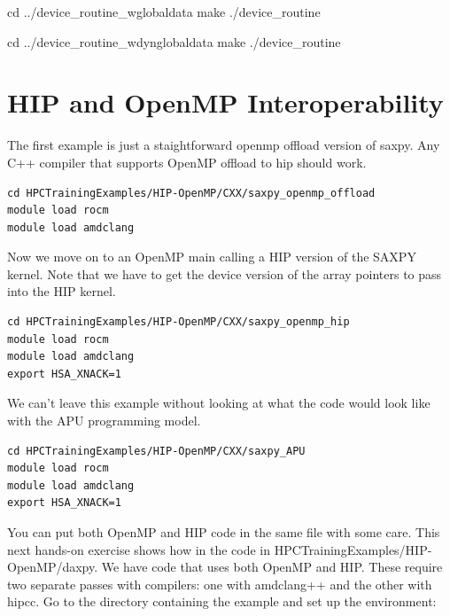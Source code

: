 \documentclass[
]{article}
\newenvironment{Shaded}{}{}
\newcommand{\BuiltInTok}[1]{#1}
\newcommand{\ExtensionTok}[1]{#1}
\newcommand{\FunctionTok}[1]{\textcolor[rgb]{0.02,0.16,0.49}{#1}}
\newcommand{\NormalTok}[1]{#1}
\begin{document}
\begin{Shaded}
\begin{Highlighting}[]
\BuiltInTok{cd}\NormalTok{ ../device\_routine\_wglobaldata}
\FunctionTok{make}
\ExtensionTok{./device\_routine}
\end{Highlighting}
\end{Shaded}

\begin{Shaded}
\begin{Highlighting}[]
\BuiltInTok{cd}\NormalTok{ ../device\_routine\_wdynglobaldata}
\FunctionTok{make}
\ExtensionTok{./device\_routine}
\end{Highlighting}
\end{Shaded}

\hypertarget{hip-and-openmp-interoperability}{%
\section{HIP and OpenMP
Interoperability}\label{hip-and-openmp-interoperability}}

The first example is just a staightforward openmp offload version
of saxpy. Any C++ compiler that supports OpenMP offload to hip should
work.

\begin{verbatim}
cd HPCTrainingExamples/HIP-OpenMP/CXX/saxpy_openmp_offload
module load rocm
module load amdclang
\end{verbatim}

Now we move on to an OpenMP main calling a HIP version of the SAXPY
kernel. Note that we have to get the device version of the array
pointers to pass into the HIP kernel.

\begin{verbatim}
cd HPCTrainingExamples/HIP-OpenMP/CXX/saxpy_openmp_hip
module load rocm
module load amdclang
export HSA_XNACK=1
\end{verbatim}

We can't leave this example without looking at what the code would
look like with the APU programming model.

\begin{verbatim}
cd HPCTrainingExamples/HIP-OpenMP/CXX/saxpy_APU
module load rocm
module load amdclang
export HSA_XNACK=1
\end{verbatim}

You can put both OpenMP and HIP code in the same file with some care.
This next hands-on exercise shows how in the code in
HPCTrainingExamples/HIP-OpenMP/daxpy. We have code that uses both OpenMP
and HIP. These require two separate passes with compilers: one with
amdclang++ and the other with hipcc. Go to the directory containing the
example and set up the environment:
\end{document}
